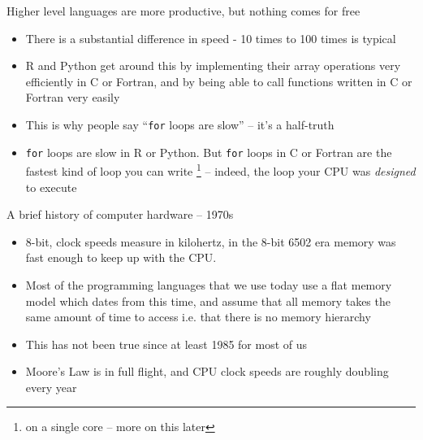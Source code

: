 \documentclass{beamer}
\begin{document}
\begin{frame}{Higher level languages are more productive, but nothing comes for free}
	\begin{itemize}
		\item There is a substantial difference in speed - 10 times to 100 times
		is typical

		\item R and Python get around this by implementing their array operations
		very efficiently in C or Fortran, and by being able to call functions written
		in C or Fortran very easily

		\item This is why people say ``\texttt{for} loops are slow''
		-- it's a half-truth

		\item \texttt{for} loops are slow in R or Python.
		But \texttt{for} loops in C or Fortran are the fastest kind of
		loop you can write \footnote{on a single core -- more on this later} -- indeed, the loop your CPU was \emph{designed}
		to execute

		
	\end{itemize}
\end{frame}

\begin{frame}{A brief history of computer hardware -- 1970s}
	\begin{itemize}
		\item 8-bit, clock speeds measure in kilohertz, in the 8-bit 6502 era
		memory was fast enough to keep up with the CPU.
		\item Most of the programming
		languages that we use today use a flat memory model which dates from this time,
		and assume that all memory takes the same amount of time to access i.e. that there
		is no memory hierarchy
		\item This has
		not been true since at least 1985 for most of us
		\item Moore's Law is in full flight, and CPU clock speeds are roughly doubling every year
	\end{itemize}
\end{frame}
\end{document}
